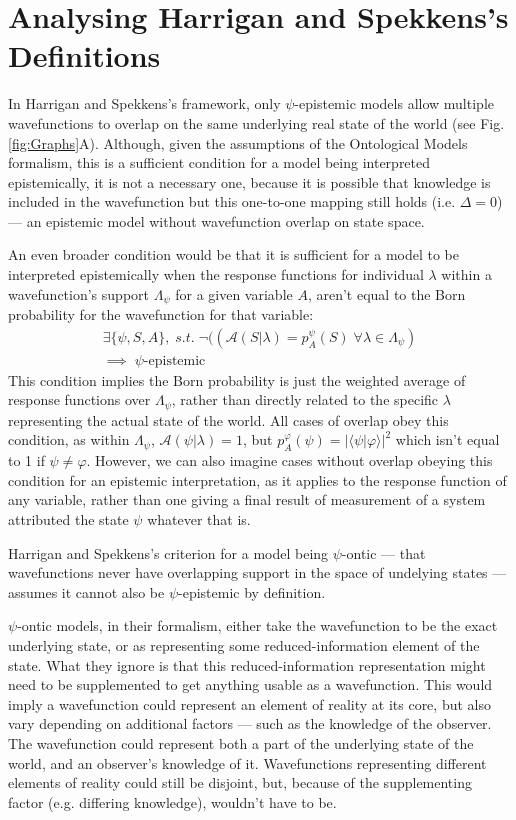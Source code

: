 \documentclass[superscriptaddress, floatfix,nofootinbib,12pt]{revtex4-2}
\newcommand{\braket}[2]{\langle #1|#2 \rangle}
\begin{document}
\section{Analysing Harrigan and Spekkens's Definitions}

In Harrigan and Spekkens's framework, only $\psi$-epistemic models allow multiple wavefunctions to overlap on the same underlying real state of the world (see Fig. \ref{fig:Graphs}A). Although, given the assumptions of the Ontological Models formalism, this is a sufficient condition for a model being interpreted epistemically, it is not a necessary one, because it is possible that knowledge is included in the wavefunction but this one-to-one mapping still holds (i.e. $\Delta=0$) --- an epistemic model without wavefunction overlap on state space.

An even broader condition would be that it is sufficient for a model to be interpreted epistemically when the response functions for individual $\lambda$ within a wavefunction's support $\Lambda_\psi$ for a given variable $A$, aren't equal to the Born probability for the wavefunction for that variable:
\begin{equation}
\begin{split}
  \exists\{\psi,S,A\},\;s.t.\;\neg((\mathcal{A}(S\vert\lambda)=p^\psi_A(S)\;\forall\lambda\in\Lambda_{\psi})\\
  \implies\;\psi\text{-epistemic}
  \end{split}
\end{equation}
This condition implies the Born probability is just the weighted average of response functions over $\Lambda_\psi$, rather than directly related to the specific $\lambda$ representing the actual state of the world. All cases of overlap obey this condition, as within $\Lambda_\psi$, $\mathcal{A}(\psi\vert\lambda)=1$, but $p^\varphi_A(\psi)=\vert\braket{\psi}{\varphi}\vert^2$ which isn't equal to 1 if $\psi\neq\varphi$. However, we can also imagine cases without overlap obeying this condition for an epistemic interpretation, as it applies to the response function of any variable, rather than one giving a final result of measurement of a system attributed the state $\psi$ whatever that is.

Harrigan and Spekkens's criterion for a model being $\psi$-ontic --- that wavefunctions never have overlapping support in the space of undelying states --- assumes it cannot also be $\psi$-epistemic by definition.

$\psi$-ontic models, in their formalism, either take the wavefunction to be the exact underlying state, or as representing some reduced-information element of the state. What they ignore is that this reduced-information representation might need to be supplemented to get anything usable as a wavefunction. This would imply a wavefunction could represent an element of reality at its core, but also vary depending on additional factors --- such as the knowledge of the observer. The wavefunction could represent both a part of the underlying state of the world, and an observer's knowledge of it. Wavefunctions representing different elements of reality could still be disjoint, but, because of the supplementing factor (e.g. differing knowledge), wouldn't have to be.
\end{document}
